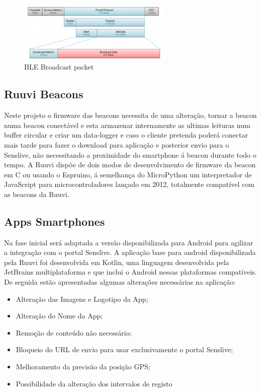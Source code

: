 \begin{figure}[htb]
\centering
\includegraphics[width=0.65\textwidth]{images/blepacket.png}
\caption{BLE Broadcast packet\cite{blepacket}}\label{blepacket}
\end{figure}


\subsection{Ruuvi Beacons}
\par Neste projeto o firmware das beacons necessita de uma alteração, tornar a beacon numa beacon conectável e esta armazenar internamente as ultimas leituras num buffer circular e criar um data-logger e caso o cliente pretenda poderá conectar mais tarde para fazer o download para aplicação e posterior envio para o Senslive, não necessitando a proximidade do smartphone á beacon durante todo o tempo. A Ruuvi dispõe de dois modos de desenvolvimento de firmware da beacon em C ou usando o Espruino, á semelhança do MicroPython um interpretador de JavaScript para microcontroladores lançado em 2012, totalmente compatível com as beacons da Ruuvi.
\subsection{Apps Smartphones}
Na fase inicial será adaptada a versão disponibilizada para Android para agilizar a integração com o portal Senslive. A aplicação base para android disponibilizada pela Ruuvi foi desenvolvida em Kotlin\cite{ruuviappgithub}, uma linguagem desenvolvida pela JetBrains multiplataforma e que inclui o Android nessas plataformas compatíveis.
De seguida estão apresentadas algumas alterações necessárias na aplicação:
\begin{itemize}
\item Alteração das Imagens e Logotipo da App;
\item Alteração do Nome da App;
\item Remoção de conteúdo não necessário;
\item Bloqueio do URL de envio para usar exclusivamente o portal Senslive;
\item Melhoramento da precisão da posição GPS;
\item Possibilidade da alteração dos intervalos de registo
\end{itemize}


